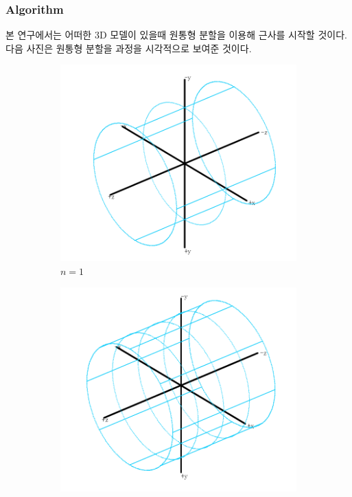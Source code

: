 \documentclass{gshs_thesis}
\theoremstyle{theorem}
\theoremstyle{lemma}
\theoremstyle{definition}
\begin{document}
\subsubsection{Algorithm}
  본 연구에서는 어떠한 3D 모델이 있을때 원통형 분할을 이용해 근사를 시작할 것이다. 다음 사진은 원통형 분할을 과정을 시각적으로 보여준 것이다.
  \\
\begin{figure}[h]
	\begin{center}
		\begin{subfigure}{.3\textwidth}
			\includegraphics[width=\textwidth]{image/subdivision1}
			\caption{$n=1$}
		\end{subfigure}
		\begin{subfigure}{.3\textwidth}
			\includegraphics[width=\textwidth]{image/subdivision2}

\end{subfigure}
\end{center}
\end{figure}
\end{document}
